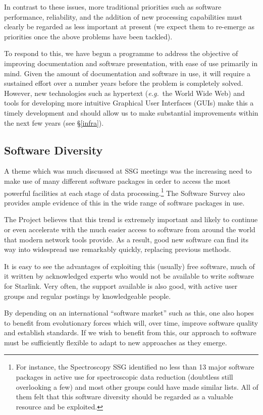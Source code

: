 \documentclass[twoside,11pt]{article}
\newcommand{\htmladdnormallink}[2]{#1}
\newcommand{\qt}[1]{``#1''}
\newcommand{\st}[1]{{\em{#1}}}
\newcommand{\qt}[1]{{\tt{"}}#1{\tt{"}}}
\newcommand{\prgurl}[0]{http://star-www.rl.ac.uk/\~{}rfws/projects/index.html}
\newcommand{\prgref}[1]{\htmladdnormallink{#1}{\prgurl}}
\begin{document}
In contrast to these issues, more traditional priorities such as
software performance, reliability, and the addition of new processing
capabilities must clearly be regarded as less important at present (we
expect them to re-emerge as priorities once the above problems have
been tackled).

To respond to this, we have begun \prgref{a programme} to address the
objective of improving documentation and software presentation, with
ease of use primarily in mind.  Given the amount of documentation and
software in use, it will require a sustained effort over a number
years before the problem is completely solved.  However, new
technologies such as hypertext (\st{e.g.}\ the World Wide Web) and
tools for developing more intuitive Graphical User Interfaces (GUIs)
make this a timely development and should allow us to make substantial
improvements within the next few years (see \S\ref{infra}).

\subsection{Software Diversity}

A theme which was much discussed at SSG meetings was the
increasing need to make use of many different software packages in
order to access the most powerful facilities at each stage of data
processing.\footnote{For instance, the Spectroscopy SSG identified no
less than 13 major software packages in active use for spectroscopic
data reduction (doubtless still overlooking a few) and most other
groups could have made similar lists. All of them felt that this
software diversity should be regarded as a valuable resource and be
exploited.}  The Software Survey also provides ample evidence of this
in the wide range of software packages in use.

The Project believes that this trend is extremely important and likely
to continue or even accelerate with the much easier access to software
from around the world that modern network tools provide. As a result,
good new software can find its way into widespread use remarkably
quickly, replacing previous methods.

It is easy to see the advantages of exploiting this (usually) free
software, much of it written by acknowledged experts who would not be
available to write software for Starlink.  Very often, the support
available is also good, with active user groups and regular postings by
knowledgeable people.

By depending on an international \qt{software market} such as this, one
also hopes to benefit from evolutionary forces which will, over time,
improve software quality and establish standards. If we wish to
benefit from this, our approach to software must be sufficiently
flexible to adapt to new approaches as they emerge.
\end{document}
